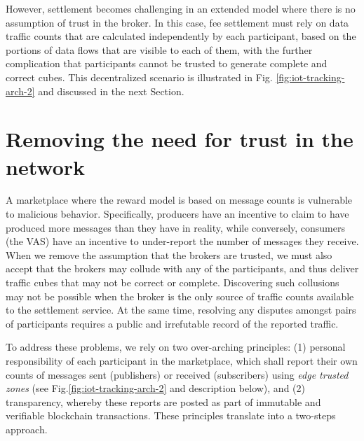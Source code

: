 \documentclass[chi_draft]{sigchi}
\begin{document}
However, settlement becomes challenging in an extended model where there is no assumption of trust in the broker.
In this case, fee settlement must rely on data traffic counts that are calculated independently by each participant, based on the portions of data flows that are visible to each of them, with the 
further complication that participants cannot be trusted to generate complete and correct cubes.
This decentralized scenario is illustrated in Fig. \ref{fig:iot-tracking-arch-2} and discussed in the next Section.

\section{Removing the need  for trust in the network}  \label{sec:no-trust}

A marketplace where the reward model is based on message counts is vulnerable to malicious behavior.
Specifically, producers have an incentive to claim to have produced more messages than they have in reality, while conversely, consumers (the VAS) have an incentive to under-report the number of messages they receive.
%
When we remove the assumption that the brokers are trusted, we must also accept that the brokers may collude with any of the participants, and thus deliver traffic cubes that may not be correct or complete.
Discovering such collusions may not be possible when the broker is the only source of traffic counts available to the settlement service.  At the same time, resolving any disputes amongst pairs of participants requires a public and irrefutable record of the reported traffic.

To address these problems, we rely on two over-arching principles: (1) personal responsibility of each participant in the marketplace, which shall report their own counts of messages sent (publishers) or received (subscribers) using \textit{edge trusted zones} (see Fig.\ref{fig:iot-tracking-arch-2} and description below),
 and (2) transparency, whereby these reports are posted as part of immutable and verifiable blockchain transactions.
These principles translate into a two-steps approach.
%
\end{document}
